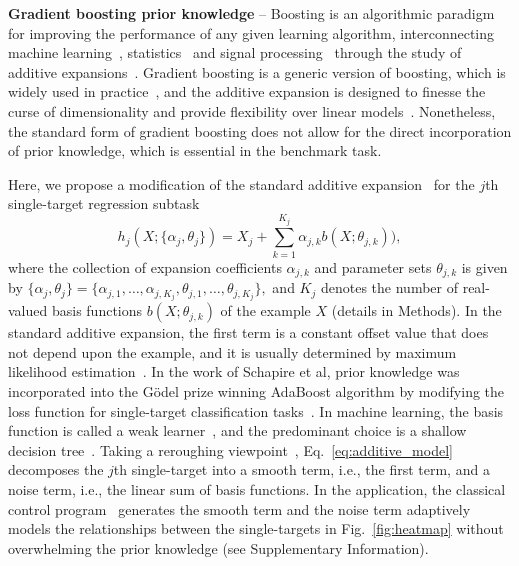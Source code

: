 \documentclass[aps,twocolumn,superscriptaddress,floatfix,preprintnumbers,showkeys]{revtex4}
\begin{document}
\textbf{Gradient boosting prior knowledge} -- Boosting is an algorithmic paradigm for improving the performance of any given learning algorithm, interconnecting machine learning~\cite{Powell_1987, Kearns_1988, Hastie_1990, Schapire_1990, Kearns_1994_3, Freund_1995, Freund_1997, Breiman_1997_1, Mason_1999, Schapire_2002, Chen_2016, Ke_2017}, statistics~\cite{Tukey_1977, Friedman_2000, Friedman_2001, Friedman_2003, Hastie_2009} and signal processing~\cite{Mallat_1993, Vincent_2002, Donoho_2012} through the study of additive expansions~\cite{Hastie_1990, Friedman_2000, Friedman_2001, Hastie_2009}. Gradient boosting is a generic version of boosting, which is widely used in practice~\cite{Friedman_2001, Friedman_2003, Hastie_2009, He_2014, Chen_2016, Ke_2017}, and the additive expansion is designed to finesse the curse of dimensionality and provide flexibility over linear models~\cite{Hastie_1990, Friedman_2000, Friedman_2001, Friedman_2003, Hastie_2009}. Nonetheless, the standard form of gradient boosting does not allow for the direct incorporation of prior knowledge, which is essential in the benchmark task.

Here, we propose a modification of the standard additive expansion~\cite{Friedman_2001, Friedman_2003, Hastie_2009, He_2014, Chen_2016, Ke_2017} for the $j$th single-target regression subtask 
\begin{equation}
\label{eq:additive_model}
h_{j}(X;\{\alpha_{j}, \theta_{j}\}) = X_{j} + \sum_{k=1}^{K_{j}} \alpha_{j,k} b (X; \theta_{j,k})),
\end{equation}
where the collection of expansion coefficients $\alpha_{j,k}$ and parameter sets $\theta_{j,k}$ is given by
$\{\alpha_{j}, \theta_{j}\} = \{\alpha_{j,1},\dots, \alpha_{j,K_{j}},\theta_{j,1},\dots,\theta_{j,K_{j}}\},$
and $K_{j}$ denotes the number of real-valued basis functions $b(X;\theta_{j,k})$ of the example $X$ (details in Methods). In the standard additive expansion, the first term is a constant offset value that does not depend upon the example, and it is usually determined by maximum likelihood estimation~\cite{Hastie_1990, Friedman_2000, Friedman_2001, Friedman_2003, Hastie_2009}. In the work of Schapire et al, prior knowledge was incorporated into the G\"{o}del prize winning AdaBoost algorithm by modifying the loss function for single-target classification tasks~\cite{Schapire_2002}. In machine learning, the basis function is called a weak learner~\cite{Kearns_1988, Schapire_1990, Kearns_1994_3, Freund_1995, Breiman_1997_1, Freund_1997, Schapire_2002}, and the predominant choice is a shallow decision tree~\cite{Friedman_2001, Friedman_2003, Hastie_2009, He_2014, Chen_2016, Ke_2017}. Taking a reroughing viewpoint~\cite{Tukey_1977}, Eq.~\ref{eq:additive_model} decomposes the $j$th single-target into a smooth term, i.e., the first term, and a noise term, i.e., the linear sum of basis functions. In the application, the classical control program~\cite{Roushan_2017, Neill_2018, Chiaro_2019} generates the smooth term and the noise term adaptively models the relationships between the single-targets in Fig.~\ref{fig:heatmap} without overwhelming the prior knowledge (see Supplementary Information).
\end{document}
